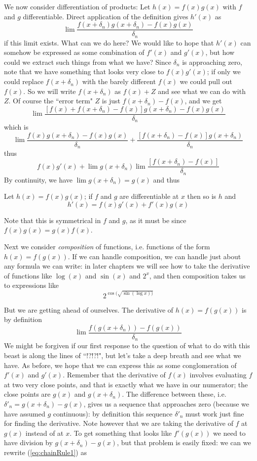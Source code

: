 We now consider differentiation of products:
Let $h(x) = f(x)g(x)$ with $f$ and $g$ differentiable. Direct application of the definition gives $h'(x)$ as
\[
\lim \frac{f(x+\delta_n)g(x+\delta_n)-f(x)g(x)}{\delta_n}
\]
if this limit exists. What can we do here? We would like to hope that $h'(x)$ can somehow be expressed as some combination of $f'(x)$ and $g'(x)$, but how could we extract such things from what we have? Since $\delta_n$ is approaching zero, note that we have something that looks very close to $f(x)g'(x)$; if only we could replace $f(x+\delta_n)$ with the barely different $f(x)$ we could pull out $f(x)$. So we will write $f(x+\delta_n)$ as $f(x)+ Z$ and see what we can do with $Z$. Of course the ``error term" $Z$ is just  $f(x+\delta_n) - f(x)$, and we get
\[
\lim \frac{[f(x)+f(x+\delta_n) - f(x)]g(x+\delta_n)-f(x)g(x)}{\delta_n}
\]
which is
\[
\lim \frac{f(x)g(x+\delta_n)-f(x)g(x)}{\delta_n} + \frac{[f(x+\delta_n) - f(x)]g(x+\delta_n)}{\delta_n}
\]
thus
\[
f(x)g'(x) + \lim g(x+\delta_n) \lim \frac{[f(x+\delta_n) - f(x)]}{\delta_n}
\]
By continuity, we have $\lim g(x+\delta_n) = g(x)$ and thus

\begin{thm}\label{thm:productRule}
Let $h(x)=f(x)g(x)$; if $f$ and $g$ are differentiable at $x$ then so is $h$ and
\[
h'(x) = f(x)g'(x) + f'(x)g(x)
\]
\end{thm}

Note that this is symmetrical in $f$ and $g$, as it must be since $f(x)g(x)=g(x)f(x)$. 

Next we consider \emph{composition} of functions, i.e. functions of the form $h(x) = f(g(x))$. If we can handle composition, we can handle just about any formula we can write: in later chapters we will see how to take the derivative of functions like $\log(x)$ and $\sin(x)$ and $2^x$, and then composition takes us to expressions like
\[
2^{\cos(\sqrt{\sin(\log x))}}
\]

But we are getting ahead of ourselves. The derivative of $h(x) = f(g(x))$ is by definition
\begin{equation}
\label{eq:chainRule1}
\lim \frac{f(g(x+\delta_n)) - f(g(x))}{\delta_n}
\end{equation}
We might be forgiven if our first response to the question of what to do with this beast is along the lines of ``!?!?!", but let's take a deep breath and see what we have. As before, we hope that we can express this as some conglomeration of $f'(x)$ and $g'(x)$. Remember that the derivative of $f(x)$ involves evaluating $f$ at two very close points, and that is exactly what we have in our numerator; the close points are $g(x)$ and $g(x+\delta_n)$. The difference between these, i.e. $\delta'_n = g(x+\delta_n)-g(x)$, gives us a sequence that approaches zero (because we have assumed $g$ continuous): by definition this sequence $\delta'_n$ must work just fine for finding the derivative. Note however that we are taking the derivative of $f$ at $g(x)$ instead of at $x$. To get something that looks like $f'(g(x))$ we  need to have division by $g(x+\delta_n)-g(x)$, but that problem is easily fixed: we can  we rewrite (\ref{eq:chainRule1}) as

